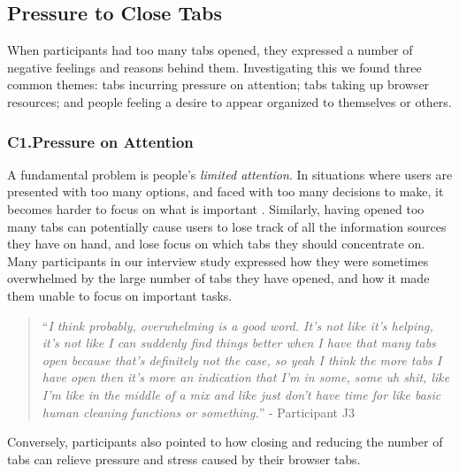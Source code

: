 \subsection{Pressure to Close Tabs}

When participants had too many tabs opened, they expressed a number of negative feelings and reasons behind them. Investigating this we found three common themes: tabs incurring pressure on attention; tabs taking up browser resources; and people feeling a desire to appear organized to themselves or others. %

\subsubsection{C1.Pressure on Attention}

A fundamental problem is people's \emph{limited attention}. In situations where users are presented with too many options, and faced with too many decisions to make, it becomes harder to focus on what is important \cite{schwartz2004paradox,wilson2008improving}. Similarly, having opened too many tabs can potentially cause users to lose track of all the information sources they have on hand, and lose focus on which tabs they should concentrate on. Many participants in our interview study expressed how they were sometimes overwhelmed by the large number of tabs they have opened, and how it made them unable to focus on important tasks.

\begin{quote} 
``\emph{I think probably, overwhelming is a good word. It's not like it's helping, it's not like I can suddenly find things better when I have that many tabs open because that's definitely not the case, so yeah I think the more tabs I have open then it's more an indication that I'm in some, some uh shit, like I'm like in the middle of a mix and like just don't have time for like basic human cleaning functions or something.}'' - Participant J3

\end{quote}

Conversely, participants also pointed to how closing and reducing the number of tabs can relieve pressure and stress caused by their browser tabs. 

